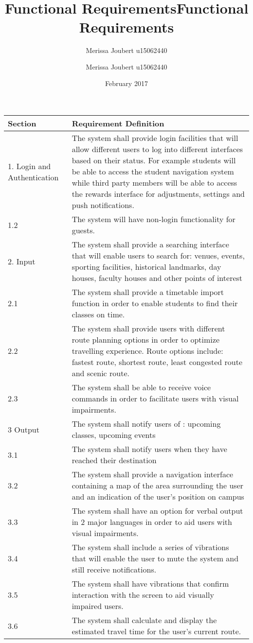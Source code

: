 \documentclass[12pt,a4paper]{report}
\author{Merissa Joubert u15062440}
\title{Functional Requirements}
\title{Functional Requirements}
\author{Merissa Joubert u15062440}
\date{February 2017}
\begin{document}
\pagebreak 

\begin{longtable}{| p{} | p{} |}
\hline
Section & Requirement Definition \\
\hline
1. Login and Authentication & The system shall provide login facilities that will allow different users to log into different interfaces based on their status. For example students will be able to access the student navigation system while third party members will be able to access the rewards interface for adjustments, settings and push notifications.  \\
\hline
1.2   & The system will have non-login functionality for guests. \\
\hline
2. Input & The system shall provide a searching interface that will enable users to search for: venues, events, sporting facilities, historical landmarks, day houses, faculty houses and other points of interest  \\
\hline
2.1  & The system shall provide a timetable import function in order to enable students to find their classes on time.  \\
\hline
2.2  & The system shall provide users with different route planning options in order to optimize travelling experience. Route options include: fastest route, shortest route, least congested route and scenic route. \\
\hline
2.3  & The system shall be able to receive voice commands in order to facilitate users with visual impairments.\\
\hline
3 Output & The system shall notify users of : upcoming classes, upcoming events\\
\hline
3.1 &The system shall notify users when they have reached their destination \\
\hline
3.2 & The system shall provide a navigation interface containing a map of the area surrounding the user and an indication of the user's position on campus\\
\hline
3.3 & The system shall have an option for verbal output in 2 major languages in order to aid users with visual impairments.\\
\hline
3.4 & The system shall include a series of vibrations that will enable the user to mute the system and still receive notifications.\\
\hline
3.5 & The system shall have vibrations that confirm interaction with the screen to aid visually impaired users.\\
\hline
3.6 & The system shall calculate and display the estimated travel time for the user's current route.\\

\end{longtable}
\end{document}
